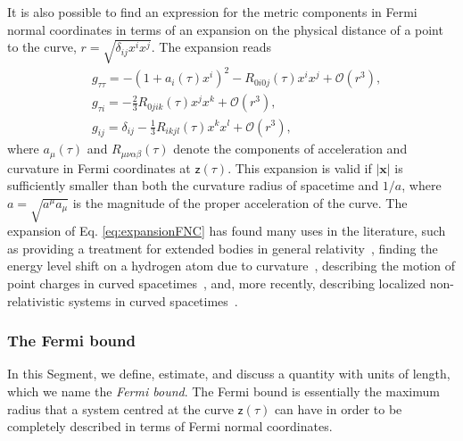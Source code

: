 \documentclass[letterpaper,12pt,titlepage,oneside,final]{book}
\newcommand{\mf}{\mathsf}%
\begin{document}
It is also possible to find an expression for the metric components in Fermi normal coordinates in terms of an expansion on the physical distance of a point to the curve, $r=\sqrt{\delta_{ij}x^ix^j}$. The expansion reads~\cite{poisson}
\begin{align}\label{eq:expansionFNC}
        &g_{\tau \tau}=-\left(1+a_i(\tau) x^i\right)^2-R_{0 {{i}} 0 {{j}}}(\tau)  x^{i}  x^{j} + \mathcal{O}(r^3),\nonumber\\
        &g_{\tau i}=-\frac{2}{3} R_{0 {{j}}{{i}}{{k}}}(\tau)  x^{j}  x^{k}+ \mathcal{O}(r^3),\nonumber\\
        &g_{ij}=\delta_{{{i}}{{j}}}-\frac{1}{3} R_{{{i}}{{k}}{{j}}{{l}}}(\tau)  x^{k}  x^{l}+ \mathcal{O}(r^3),
\end{align}
where $a_\mu(\tau)$ and $R_{\mu\nu\alpha\beta}(\tau)$ denote the components of acceleration and curvature in Fermi coordinates at $\mf z(\tau)$. This expansion is valid if $|\bm x|$ is sufficiently smaller than both the curvature radius of spacetime and $1/a$, where $a = \sqrt{a^\mu a_\mu}$ is the magnitude of the proper acceleration of the curve. The expansion of Eq. \eqref{eq:expansionFNC} has found many uses in the literature, such as providing a treatment for extended bodies in general relativity~\cite{DixonI,DixonII,DixonIII}, finding the energy level shift on a hydrogen atom due to curvature~\cite{parker,ParkerRevLett,ParkerHydrogen}, describing the motion of point charges in curved spacetimes~\cite{poisson}, and, more recently, describing localized non-relativistic systems in curved spacetimes~\cite{us,jonas,mine,theguy,ahmed,Nico}.




\subsubsection*{The Fermi bound}\label{sub:fermibound}

In this Segment, we define, estimate, and discuss a quantity with units of length, which we name the \emph{Fermi bound}. The Fermi bound is essentially the maximum radius that a system centred at the curve $\mf z(\tau)$ can have in order to be completely described in terms of Fermi normal coordinates.
\end{document}
